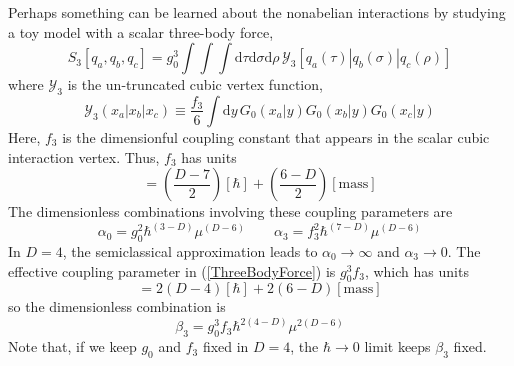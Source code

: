Perhaps something can be learned about the nonabelian interactions by studying a toy model with a scalar three-body force,
\begin{equation}
	S_{3}[q_{a}, q_{b}, q_{c}] = g^{3}_{0} \int \int \int \mathrm{d}\tau \mathrm{d}\sigma \mathrm{d}\rho \, \mathcal{Y}_{3}[q_{a}(\tau) | q_{b}(\sigma) |q_{c}(\rho)] \label{ThreeBodyForce}
\end{equation}
where $\mathcal{Y}_{3}$ is the un-truncated cubic vertex function,
\begin{equation}
	\mathcal{Y}_{3}(x_{a}|x_{b}|x_{c}) \equiv \frac{f_{3}}{6} \int \mathrm{d}y \, G_{0}(x_{a}|y) G_{0}(x_{b}|y) G_{0}(x_{c}|y)
\end{equation}
Here, $f_{3}$ is the dimensionful coupling constant that appears in the scalar cubic interaction vertex. Thus, $f_{3}$ has units
\begin{equation}
	[f_{3}] = \left( \frac{D - 7}{2} \right) [\hbar] + \left( \frac{6 - D}{2} \right) [\text{mass}]
\end{equation}
The dimensionless combinations involving these coupling parameters are
\begin{equation}
	\alpha_{0} = g^{2}_{0} \hbar^{(3 - D)} \mu^{(D - 6)} \qquad \alpha_{3} = f^{2}_{3} \hbar^{(7 - D)} \mu^{(D - 6)}
\end{equation}
In $D = 4$, the semiclassical approximation leads to $\alpha_{0} \rightarrow \infty$ and $\alpha_{3} \rightarrow 0$. The effective coupling parameter in (\ref{ThreeBodyForce}) is $g_{0}^{3} f_{3}$, which has units
\begin{equation}
	[g_{0}^{3} f_{3}] = 2 (D - 4) [\hbar] + 2 (6 - D) [\text{mass}]
\end{equation}
so the dimensionless combination is
\begin{equation}
	\beta_{3} = g_{0}^{3} f_{3} \hbar^{2(4 - D)} \mu^{2(D - 6)}
\end{equation}
Note that, if we keep $g_{0}$ and $f_{3}$ fixed in $D = 4$, the $\hbar \rightarrow 0$ limit keeps $\beta_{3}$ fixed.

